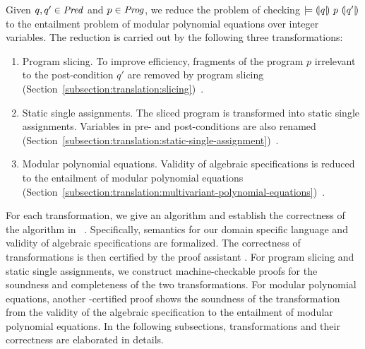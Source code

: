 
Given $q, q' \in \mathit{Pred}$ and $p \in \mathit{Prog}$, we reduce the problem of checking
$\models {(\!|}{q}{|\!)}~{p}~{(\!|}{q'}{|\!)}$ to the entailment problem of modular
polynomial equations over integer variables. The reduction is carried out by
the following three transformations:
\begin{enumerate}
\item Program slicing. To improve efficiency, fragments of the program $p$
  irrelevant to the post-condition $q'$ are removed by program
  slicing (Section~\ref{subsection:translation:slicing})~\cite{W:81:PS}. 
\item Static single assignments. The sliced program is transformed
  into static single assignments. Variables in pre- and
  post-conditions are also renamed
  (Section~\ref{subsection:translation:static-single-assignment})~\cite{AWZ:88:DQVP}.
\item Modular polynomial equations. Validity of algebraic specifications
  is reduced to the entailment of modular polynomial equations
  (Section~\ref{subsection:translation:multivariant-polynomial-equations})~\cite{H:07:AENTP}. 
\end{enumerate}

For each transformation, we give an algorithm and establish the
correctness of the algorithm in \coq~\cite{YC:2004:ITPPDC}. 
Specifically, semantics
for our domain specific language and validity of algebraic
specifications are formalized. The correctness of
transformations is then certified by the proof assistant \coq.
For program slicing and static single assignments, we
construct machine-checkable proofs for the soundness and completeness
of the two transformations. For modular polynomial equations, another
\coq-certified proof shows the soundness of the transformation
from the validity of the algebraic specification to the entailment of 
modular polynomial equations. In the following subsections,
transformations and their correctness are elaborated in details.  